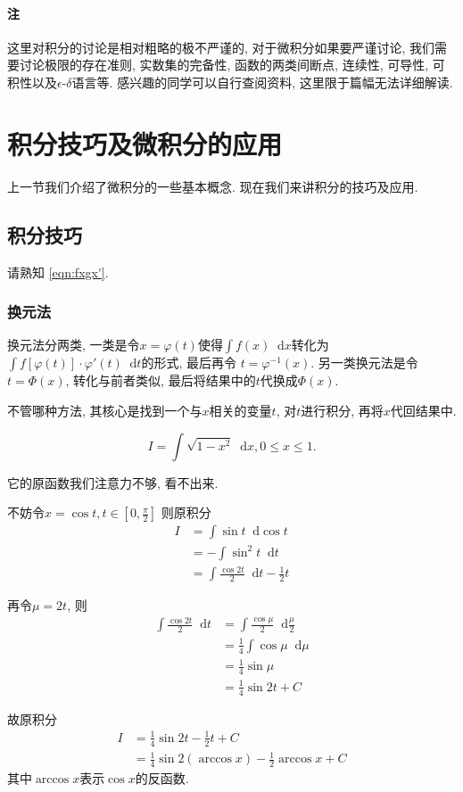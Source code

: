 \documentclass[UTF8]{mathrep}
\newcommand*{\dif}{\mathop{}\!\mathrm{d}}
\begin{document}
\paragraph{注}
这里对积分的讨论是相对粗略的极不严谨的, 对于微积分如果要严谨讨论,
我们需要讨论极限的存在准则,
实数集的完备性, 函数的两类间断点, 连续性, 可导性, 可积性以及$\epsilon \text{-} \delta $语言等.
感兴趣的同学可以自行查阅资料, 这里限于篇幅无法详细解读.

\section{积分技巧及微积分的应用}
上一节我们介绍了微积分的一些基本概念. 现在我们来讲积分的技巧及应用.

\subsection{积分技巧}
请熟知 \cref{eqn:fxgx'}.
\subsubsection*{换元法}
换元法分两类, 一类是令$x = \varphi (t)$使得$\int f(x)\dif x $转化为$\int
f\left[\varphi (t)\right] \cdot \varphi '(t) \dif t$的形式,
最后再令 $t = \varphi ^{-1} (x) $.
另一类换元法是令$t=\Phi (x)$, 转化与前者类似, 最后将结果中的$t$代换成$\Phi (x)$.

不管哪种方法, 其核心是找到一个与$x$相关的变量$t$, 对$t$进行积分, 再将$x$代回结果中.

\begin{example}
  \[
    I = \int \sqrt{1-x^{2} } \dif x, 0 \leq x \leq 1
  .\]

  它的原函数我们注意力不够, 看不出来.

  不妨令$x = \cos t,t \in \left[0,\frac{\pi}{2} \right]$
  则原积分
  \begin{align*}
    I & = \int  \sin t \dif \cos t                        \\
    & = - \int \sin ^{2} t \dif t                       \\
    & = \int \frac{ \cos 2t }{2} \dif t - \frac{1}{2} t
  \end{align*}

  再令$\mu  = 2t$, 则
  \begin{align*}
    \int \frac{\cos 2t}{2}\dif t & = \int \frac{\cos  \mu}{2} \dif
    \frac{\mu}{2}                                                       \\
    & = \frac{1}{4} \int \cos \mu \dif \mu \\
    & = \frac{1}{4} \sin \mu               \\
    & = \frac{1}{4} \sin  2t + C
  \end{align*}

  故原积分
  \begin{align*}
    I & = \frac{1}{4} \sin  2t - \frac{1}{2}t +C                    \\
    & = \frac{1}{4} \sin 2(\arccos x ) - \frac{1}{2} \arccos x +C
  \end{align*}
  其中$\arccos x$表示$\cos x$的反函数.
\end{example}
\end{document}
